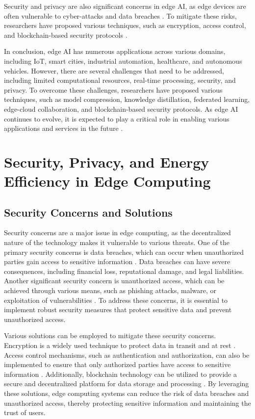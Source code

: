 \documentclass[11pt]{article}
\begin{document}
Security and privacy are also significant concerns in edge AI, as edge devices are often vulnerable to cyber-attacks and data breaches \cite{ref106}. To mitigate these risks, researchers have proposed various techniques, such as encryption, access control, and blockchain-based security protocols \cite{ref107}.

In conclusion, edge AI has numerous applications across various domains, including IoT, smart cities, industrial automation, healthcare, and autonomous vehicles. However, there are several challenges that need to be addressed, including limited computational resources, real-time processing, security, and privacy. To overcome these challenges, researchers have proposed various techniques, such as model compression, knowledge distillation, federated learning, edge-cloud collaboration, and blockchain-based security protocols. As edge AI continues to evolve, it is expected to play a critical role in enabling various applications and services in the future \cite{ref108}.

\section{Security, Privacy, and Energy Efficiency in Edge Computing}

\subsection{Security Concerns and Solutions}

Security concerns are a major issue in edge computing, as the decentralized nature of the technology makes it vulnerable to various threats. One of the primary security concerns is data breaches, which can occur when unauthorized parties gain access to sensitive information \cite{ref53}. Data breaches can have severe consequences, including financial loss, reputational damage, and legal liabilities. Another significant security concern is unauthorized access, which can be achieved through various means, such as phishing attacks, malware, or exploitation of vulnerabilities \cite{ref15}. To address these concerns, it is essential to implement robust security measures that protect sensitive data and prevent unauthorized access.

Various solutions can be employed to mitigate these security concerns. Encryption is a widely used technique to protect data in transit and at rest \cite{ref88}. Access control mechanisms, such as authentication and authorization, can also be implemented to ensure that only authorized parties have access to sensitive information \cite{ref109}. Additionally, blockchain technology can be utilized to provide a secure and decentralized platform for data storage and processing \cite{ref110}. By leveraging these solutions, edge computing systems can reduce the risk of data breaches and unauthorized access, thereby protecting sensitive information and maintaining the trust of users.
\end{document}
